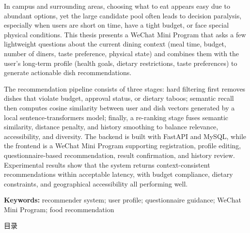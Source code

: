 \documentclass[a4paper,12pt,oneside,openany]{ctexbook}
\begin{document}
In campus and surrounding areas, choosing what to eat appears easy due to abundant options, yet the large candidate pool often leads to decision paralysis, especially when users are short on time, have a tight budget, or face special physical conditions. This thesis presents a WeChat Mini Program that asks a few lightweight questions about the current dining context (meal time, budget, number of diners, taste preference, physical state) and combines them with the user's long-term profile (health goals, dietary restrictions, taste preferences) to generate actionable dish recommendations.

The recommendation pipeline consists of three stages: hard filtering first removes dishes that violate budget, approval status, or dietary taboos; semantic recall then computes cosine similarity between user and dish vectors generated by a local sentence-transformers model; finally, a re-ranking stage fuses semantic similarity, distance penalty, and history smoothing to balance relevance, accessibility, and diversity. The backend is built with FastAPI and MySQL, while the frontend is a WeChat Mini Program supporting registration, profile editing, questionnaire-based recommendation, result confirmation, and history review. Experimental results show that the system returns context-consistent recommendations within acceptable latency, with budget compliance, dietary constraints, and geographical accessibility all performing well.

\vspace{\baselineskip}
\noindent\textbf{ Keywords: }{ recommender system; user profile; questionnaire guidance; WeChat Mini Program; food recommendation}

\clearpage
\thispagestyle{tocstyle} %
\begin{center}
\vspace*{-0.5\baselineskip}
{\heiti 目\quad 录}
\vspace*{-4\baselineskip}
\end{center}

\renewcommand{\contentsname}{} 
\tableofcontents
\clearpage

\pagestyle{fancy}
\setcounter{page}{1}








\end{document}
